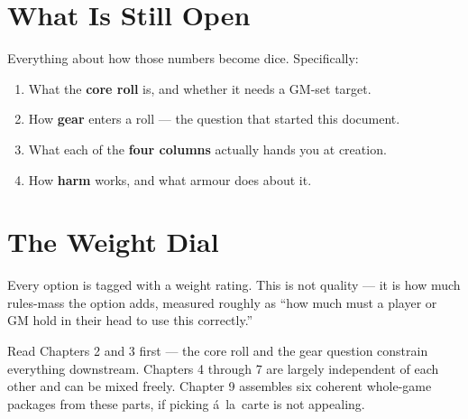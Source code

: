 \documentclass[11pt,oneside]{memoir}
\begin{document}
\section{What Is Still Open}

Everything about how those numbers become dice. Specifically:

\begin{enumerate}
  \item What the \textbf{core roll} is, and whether it needs a GM-set target.
  \item How \textbf{gear} enters a roll --- the question that started this document.
  \item What each of the \textbf{four columns} actually hands you at creation.
  \item How \textbf{harm} works, and what armour does about it.
\end{enumerate}

\section{The Weight Dial}

Every option is tagged with a weight rating. This is not quality --- it is
how much rules-mass the option adds, measured roughly as ``how much must a
player or GM hold in their head to use this correctly.''

\begin{center}
\end{center}

\begin{dread}
Read Chapters 2 and 3 first --- the core roll and the gear question
constrain everything downstream. Chapters 4 through 7 are largely
independent of each other and can be mixed freely. Chapter 9 assembles
six coherent whole-game packages from these parts, if picking
\'a~la~carte is not appealing.
\end{dread}
\end{document}

